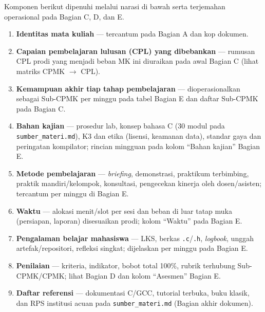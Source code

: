\documentclass[12pt,a4paper]{article}
\begin{document}
Komponen berikut dipenuhi melalui narasi di bawah serta terjemahan operasional pada Bagian C, D, dan E.

\begin{enumerate}[leftmargin=*,label=\textbf{\arabic*.}]
  \item \textbf{Identitas mata kuliah} --- tercantum pada Bagian A dan kop dokumen.

  \item \textbf{Capaian pembelajaran lulusan (CPL) yang dibebankan} --- rumusan CPL prodi yang menjadi beban MK ini diuraikan pada awal Bagian C (lihat matriks CPMK $\rightarrow$ CPL).

  \item \textbf{Kemampuan akhir tiap tahap pembelajaran} --- dioperasionalkan sebagai Sub-CPMK per minggu pada tabel Bagian E dan daftar Sub-CPMK pada Bagian C.

  \item \textbf{Bahan kajian} --- prosedur lab, konsep bahasa C (30 modul pada \texttt{sumber\_materi.md}), K3 dan etika (lisensi, keamanan data), standar gaya dan peringatan kompilator; rincian mingguan pada kolom ``Bahan kajian'' Bagian E.

  \item \textbf{Metode pembelajaran} --- \textit{briefing}, demonstrasi, praktikum terbimbing, praktik mandiri/kelompok, konsultasi, pengecekan kinerja oleh dosen/asisten; tercantum per minggu di Bagian E.

  \item \textbf{Waktu} --- alokasi menit/slot per sesi dan beban di luar tatap muka (persiapan, laporan) disesuaikan prodi; kolom ``Waktu'' pada Bagian E.

  \item \textbf{Pengalaman belajar mahasiswa} --- LKS, berkas \texttt{.c}/\texttt{.h}, \textit{logbook}, unggah artefak/repositori, refleksi singkat; dijelaskan per minggu pada Bagian E.

  \item \textbf{Penilaian} --- kriteria, indikator, bobot total 100\%, rubrik terhubung Sub-CPMK/CPMK; lihat Bagian D dan kolom ``Asesmen'' Bagian E.

  \item \textbf{Daftar referensi} --- dokumentasi C/GCC, tutorial terbuka, buku klasik, dan RPS institusi acuan pada \texttt{sumber\_materi.md} (Bagian akhir dokumen).
\end{enumerate}

\vspace{0.75cm}
\end{document}
